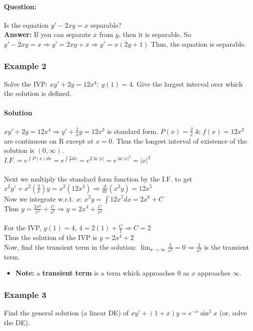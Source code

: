 \documentclass{article}
\begin{document}
\paragraph{Question:} Is the equation $y'-2xy=x$ separable?\\
\textbf{Answer:} If you can separate $x$ from $y$, then it is separable. So $y'-2xy=x\Rightarrow y'=2xy+x\Rightarrow y'=x(2y+1)$
Thus, the equation is separable.


\subsubsection{Example 2}
Solve the IVP: $xy'+2y=12x^4;\:y(1)=4$. Give the largest interval over which the solution is defined.
\paragraph{Solution} $xy'+2y=12x^4\Rightarrow y'+\frac{2}{x}y=12x^3$ is standard form. $P(x)=\frac{2}{x}\;\&\;f(x)=12x^3$ are continuous on R except at $x=0$. Thus the longest interval of existence of the solution is $(0, \infty)$.
\\$I.F.=e^{\int\!P(x)dx}=e^{\int\frac{2}{x}dx}=e^{2\ln|x|}=e^{\ln{|x|}^2}=|x|^2$
\\\\Next we multiply the standard form function by the I.F. to get $x^2y'+x^2\left(\frac{2}{x}\right)y=x^2(12x^3)\Rightarrow \frac{d}{dx}(x^2y)=12x^5$
\\Now we integrate w.r.t. $x$: $x^2y=\int 12x^5dx=2x^6+C$
\\Thus $y=\frac{2x^6}{x^2}+\frac{C}{x^2}\Rightarrow y=2x^4+\frac{C}{x^2}$
\\\\For the IVP, $y(1)=4$, $4=2(1)+\frac{C}{1}\Rightarrow C=2$
\\Thus the solution of the IVP is $y=2x^4+2$
\\Now, find the transient term in the solution: $\lim_{x \to \infty}\frac{2}{x^2}=0\Rightarrow\frac{2}{x^2}$ is the transient term.
\begin{itemize}
    \item \textbf{Note:} a \textbf{transient term} is a term which approaches 0 as $x$ approaches $\infty$.
\end{itemize}

\subsubsection{Example 3}
Find the general solution (a linear DE) of $xy'+(1+x)y=e^{-x}\sin^2x$ (or, solve the DE).
\end{document}
